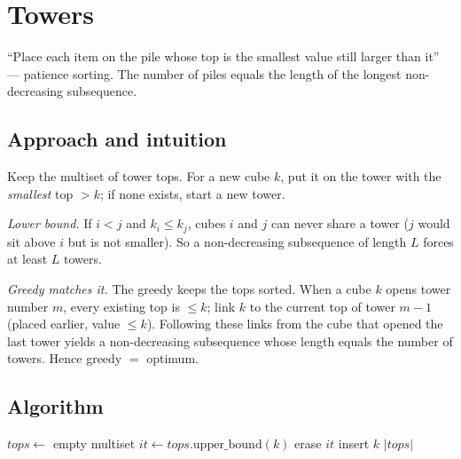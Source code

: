 \section{Towers}
\label{sec:g-towers}


\begin{patternbox}
``Place each item on the pile whose top is the smallest value still
larger than it'' --- patience sorting. The number of piles equals the length
of the longest non-decreasing subsequence.
\end{patternbox}

\subsection*{Approach and intuition}

Keep the multiset of tower tops. For a new cube $k$, put it on the tower with
the \emph{smallest} top $>k$; if none exists, start a new tower.

\begin{ideabox}
\emph{Lower bound.} If $i<j$ and $k_i\le k_j$, cubes $i$ and $j$ can never
share a tower ($j$ would sit above $i$ but is not smaller). So a
non-decreasing subsequence of length $L$ forces at least $L$ towers.

\emph{Greedy matches it.} The greedy keeps the tops sorted. When a cube $k$
opens tower number $m$, every existing top is $\le k$; link $k$ to the current
top of tower $m-1$ (placed earlier, value $\le k$). Following these links
from the cube that opened the last tower yields a non-decreasing subsequence
whose length equals the number of towers. Hence greedy $=$ optimum.
\end{ideabox}

\subsection*{Algorithm}
\begin{algorithmic}[1]
\State $tops\gets$ empty multiset
  \State $it\gets tops.\text{upper\_bound}(k)$
   erase $it$ \EndIf
  \State insert $k$
\EndFor
\State \Return $|tops|$
\end{algorithmic}

